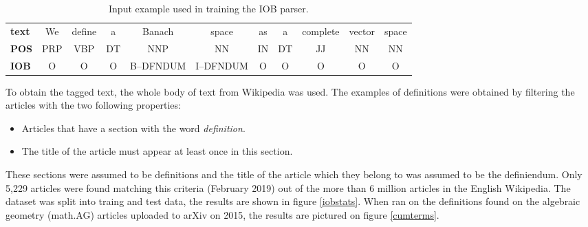 \documentclass[a4paper]{easychair}
\begin{document}
\begin{table}[h]
    \begin{center}
        {\scriptsize
        \begin{tabular}{lcccccccccc}
        \hline
            \textbf{text} &We & define & a & Banach & space & as & a & complete & vector & space \\
            \textbf{POS}&PRP & VBP & DT & NNP & NN & IN & DT & JJ & NN & NN\\
            \textbf{IOB} & O& O& O& B--DFNDUM & I--DFNDUM & O& O& O& O& O \\
         \hline
    \end{tabular}
        \caption{\label{iobtags} Input example used in  training the IOB parser.}}
    \end{center} 
\end{table}

To obtain the tagged text, the whole body of text from Wikipedia was used. The examples of definitions were obtained by filtering the articles with the two following properties:
\begin{itemize}
    \item Articles that have a section with the word \textit{definition}.
    \item The title of the article must appear at least once in this section.
\end{itemize}
These sections were assumed to be definitions and the title of the article which they belong to was assumed to be the definiendum.  Only 5,229 articles were found matching this criteria (February 2019) out of the more than 6 million articles in the English Wikipedia. The dataset was split into traing and test data, the results are shown in figure \ref{iobstats}. When ran on the definitions found on the algebraic geometry (math.AG) articles uploaded to arXiv on 2015, the results are pictured on figure \ref{cumterms}.
\end{document}
